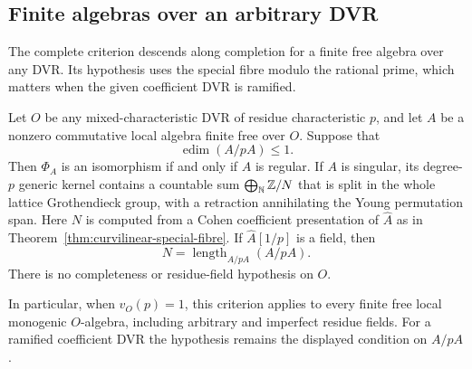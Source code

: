 \subsection{Finite algebras over an arbitrary DVR}

The complete criterion descends along completion for a finite free
algebra over any DVR.  Its hypothesis uses the special fibre modulo
the rational prime, which matters when the given coefficient DVR is
ramified.

\begin{corollary}\label{cor:arithmetic-curvilinear}\label{cor:arbitrary-dvr-curvilinear}
Let $O$ be any mixed-characteristic DVR of residue characteristic
$p$, and let $A$ be a nonzero commutative local algebra finite free
over $O$.  Suppose that
\[
 \operatorname{edim}(A/pA)\leq1.
\]
Then $\Phi_A$ is an isomorphism if and only if $A$ is regular.
If $A$ is singular, its degree-$p$ generic kernel contains a
countable sum $\bigoplus_{\mathbb N}\mathbb Z/N$ that is split in the
whole lattice Grothendieck group, with a retraction annihilating
the Young permutation span.  Here $N$ is computed from a Cohen
coefficient presentation of $\widehat A$ as in
Theorem~\ref{thm:curvilinear-special-fibre}.
If $\widehat A[1/p]$ is a field, then
\[
 N=\operatorname{length}_{A/pA}(A/pA).
\]
There is no completeness or residue-field hypothesis on $O$.

In particular, when $v_O(p)=1$, this criterion applies to every
finite free local monogenic $O$-algebra, including arbitrary and
imperfect residue fields.  For a ramified coefficient DVR the
hypothesis remains the displayed condition on $A/pA$.
\end{corollary}

